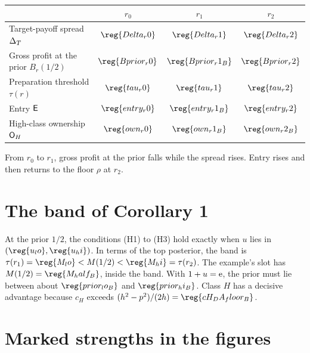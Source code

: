 \begin{center}
\begin{tabular}{@{}lccc@{}}
\toprule
 & \(r_0\) & \(r_1\) & \(r_2\)\\
\midrule
Target-payoff spread \(\Delta_T\) & \(\reg{Delta_r0}\) & \(\reg{Delta_r1}\) & \(\reg{Delta_r2}\)\\
Gross profit at the prior \(B_r(1/2)\) & \(\reg{Bprior_r0}\) & \(\reg{Bprior_r1_B}\) & \(\reg{Bprior_r2}\)\\
Preparation threshold \(\tau(r)\) & \(\reg{tau_r0}\) & \(\reg{tau_r1}\) & \(\reg{tau_r2}\)\\
Entry \(\mathsf{E}\) & \(\reg{entry_r0}\) & \(\reg{entry_r1_B}\) & \(\reg{entry_r2}\)\\
High-class ownership \(\mathsf{O}_H\) & \(\reg{own_r0}\) & \(\reg{own_r1_B}\) & \(\reg{own_r2_B}\)\\
\bottomrule
\end{tabular}
\end{center}

From \(r_0\) to \(r_1\), gross profit at the prior falls while the spread rises. Entry rises and then returns to the floor \(\rho\) at \(r_2\).

\section{The band of Corollary 1}

At the prior \(1/2\), the conditions (H1) to (H3) hold exactly when \(u\) lies in \((\reg{u_lo},\reg{u_hi})\).
In terms of the top posterior, the band is \(\tau(r_1)=\reg{M_lo}<M(1/2)<\reg{M_hi}=\tau(r_2)\).
The example's slot has \(M(1/2)=\reg{M_half_B}\), inside the band.
With \(1+u=\mathrm{e}\), the prior must lie between about \(\reg{prior_lo_B}\) and \(\reg{prior_hi_B}\).
Class \(H\) has a decisive advantage because \(c_H\) exceeds \((h^2-p^2)/(2h)=\reg{cH_DA_floor_B}\).

\section{Marked strengths in the figures}

